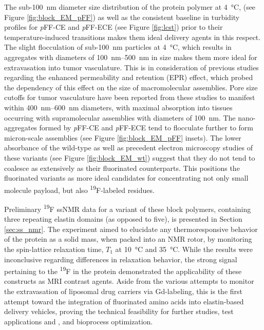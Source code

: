 \begin{refsection}
The sub-\SI{100}{\nm} diameter size distribution of the protein polymer at
\SI{4}{\celsius}, (see Figure \ref{fig:block_EM_pFF}) as well as the consistent
baseline in turbidity profiles for \emph{p}FF-CE and \emph{p}FF-ECE (see Figure
\ref{fig:lcst}) prior to their temperature-induced transitions makes them ideal
delivery agents in this respect. The slight flocculation of sub-\SI{100}{\nm}
particles at \SI{4}{\celsius}, which results in aggregates with diameters of
\SIrange{100}{500}{\nm} in size makes them more ideal for extravasation into
tumor vasculature. This is in consideration of previous studies regarding the
enhanced permeability and retention (EPR) effect, which probed the dependency of
this effect on the size of macromolecular assemblies. Pore size cutoffs for
tumor vasculature have been reported from these studies to manifest within
\SIrange{400}{600}{\nm} diameters,\cite{Yuan1995} with maximal absorption into
tissues occurring with supramolecular assemblies with diameters of
\SI{100}{\nm}.\cite{Charrois2003} The nano-aggregates formed by \emph{p}FF-CE
and \emph{p}FF-ECE tend to flocculate further to form micron-scale assemblies
(see Figure \ref{fig:block_EM_pFF} insets). The lower absorbance of the
wild-type as well as precedent electron microscopy studies of these variants
(see Figure \ref{fig:block_EM_wt}) suggest that they do not tend to coalesce as
extensively as their fluorinated counterparts. This positions the fluorinated
variants as more ideal candidates for concentrating not only small molecule
payload, but also \textsuperscript{19}F-labeled residues.

Preliminary \textsuperscript{19}F ssNMR data for a variant of these block
polymers, containing three repeating elastin domains (as opposed to five), is
presented in Section \ref{sec:ss_nmr}. The experiment aimed to elucidate any
thermoresponsive behavior of the protein as a solid mass, when packed into an
NMR rotor, by monitoring the spin-lattice relaxation time, ${T_{1}}$ at
\SI{10}{\celsius} and \SI{35}{\celsius}. While the results were inconclusive
regarding differences in relaxation behavior, the strong signal pertaining to the
\textsuperscript{19}F in the protein demonstrated the applicability of these
constructs as MRI contrast agents. Aside from the various attempts to monitor the
extravasation of liposomal drug carriers via Gd-labeling,\cite{Tagami2011} this
is the first attempt toward the integration of fluorinated amino acids into
elastin-based delivery vehicles, proving the technical feasibility for further
studies, test applications  and , and bioprocess
optimization.


\end{refsection}
